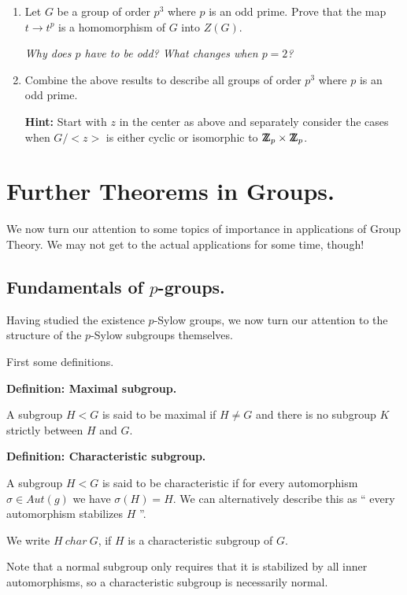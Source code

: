 \documentclass[12pt]{article}
\newcommand{\deff}[1]{{\bf Definition: #1} }
\def\DZ{ \mbox{\rm Z \kern -0.75em Z} }
\begin{document}
\begin{enumerate}
\item Let $G$ be a group of order $p^3$ where $p$ is an odd prime.
Prove that the map $t\rightarrow t^{p}$ is a homomorphism of $G$ into
$Z(G)$.

{\it Why does $p$ have to be odd? What changes when $p=2$?}

\item Combine the above results to describe all groups of order $p^3$
where $p$ is an odd prime.

{\bf Hint:} Start with $z$ in the center as above and separately 
consider the cases
when $G/<z>$ is either cyclic or isomorphic to $\DZ_p \times \DZ_p$.


\end{enumerate}

\section{Further Theorems in Groups.}
We now turn our attention to some topics of importance in applications 
of Group Theory. We may not get to the actual applications for some time, 
though!

\subsection{Fundamentals of $p$-groups.}
Having studied the existence $p$-Sylow groups, we now turn our attention 
to the structure of the $p$-Sylow subgroups themselves.

First some definitions.

\deff{Maximal subgroup.} 

A subgroup $H<G$ is said to be maximal if
$H\neq G$ and there is no subgroup $K$ strictly between $H$ and $G$.

\deff{Characteristic subgroup.}
 
A subgroup $H<G$ is said to be
characteristic if for every automorphism $\sigma \in Aut(g)$ we have
$\sigma(H)=H$. We can alternatively describe this as 
`` every automorphism stabilizes $H$ ''.

We write $H~char~G$, if $H$ is a characteristic subgroup of $G$.

Note that a normal subgroup only requires that it is stabilized by all
inner automorphisms, so a characteristic subgroup is necessarily normal.
\end{document}
